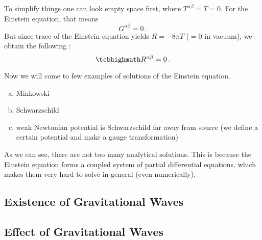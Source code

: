 


To simplify things one can look empty space first, where $T^{\alpha \beta} = T = 0$. For the Einstein equation, that means
\begin{equation*}
G^{\alpha \beta} = 0 \, .
\end{equation*}
But since trace of the Einstein equation yields $R = - 8 \pi T$ ($= 0$ in vacuum), we obtain the following :
\begin{equation}
\eqbox{
R^{\alpha \beta} = 0
} \, .
\end{equation}


Now we will come to few examples of solutions of the Einstein equation.%
\begin{ex}
\begin{enumerate}[(a)]
\item Minkowski


\item Schwarzschild


\item weak Newtonian potential is Schwarzschild far away from source (we define a certain potential and make a gauge transformation)
\end{enumerate}
\end{ex}
As we can see, there are not too many analytical solutions. This is because the Einstein equation forms a coupled system of partial differential equations, which makes them very hard to solve in general (even numerically).



		\subsection{Existence of Gravitational Waves}



		\subsection{Effect of Gravitational Waves}







